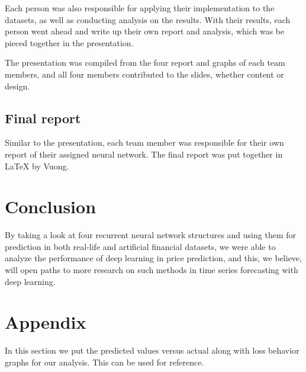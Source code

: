 \documentclass[letterpaper, 10 pt, conference]{ieeeconf}  %
\begin{document}
        Each person was also responsible for applying their implementation to the datasets, as well as conducting analysis on the results. With their results, each person went ahead and write up their own report and analysis, which was be pieced together in the presentation.

        The presentation was compiled from the four report and graphs of each team members, and all four members contributed to the slides, whether content or design.

    \subsection{Final report}
        Similar to the presentation, each team member was responsible for their own report of their assigned neural network. The final report was put together in LaTeX by Vuong.

\section{Conclusion}
    By taking a look at four recurrent neural network structures and using them for prediction in both real-life and artificial financial datasets, we were able to analyze the performance of deep learning in price prediction, and this, we believe, will open paths to more research on such methods in time series forecasting with deep learning. 

\section{Appendix}
    In this section we put the predicted values versus actual along with loss behavior graphs for our analysis. This can be used for reference.

\cite{PURUSHOTHAM2018112}



\end{document}
